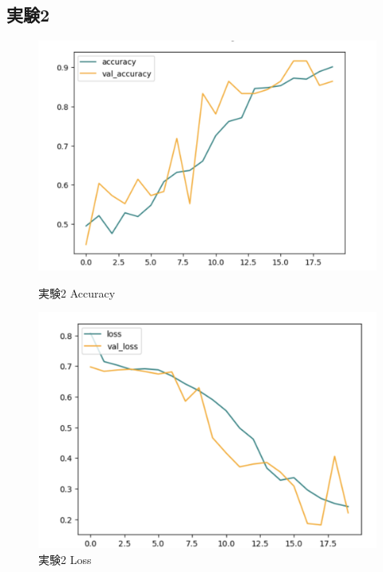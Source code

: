 \documentclass[a4paper, 11pt, titlepage]{jsarticle}
\begin{document}
\subsection{実験2}
\begin{figure}[htbp]
  \begin{minipage}[b]{0.45\linewidth}
    \centering
    \includegraphics[keepaspectratio, scale=0.33]{ex2_acc.png}
    \caption{実験2 Accuracy}
  \end{minipage}
  \begin{minipage}[b]{0.45\linewidth}
    \centering
    \includegraphics[keepaspectratio, scale=0.33]{ex2_loss.png}
    \caption{実験2 Loss}
  \end{minipage}
\end{figure}
\end{document}
